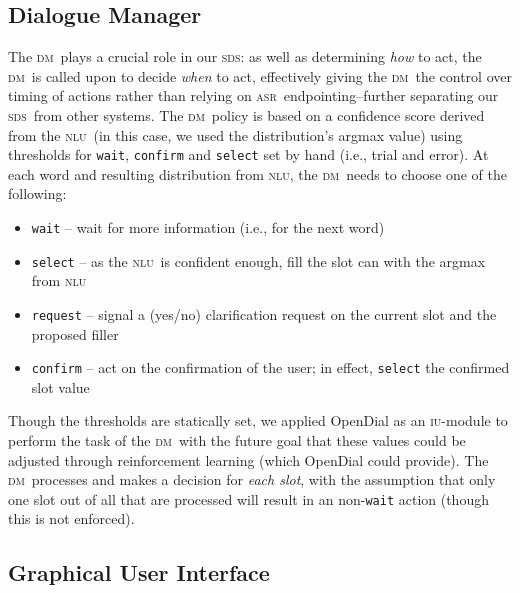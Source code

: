 \documentclass[11pt]{article}
\newcommand{\sds}[0]{\textsc{sds}}
\newcommand{\nlu}[0]{\textsc{nlu}}
\newcommand{\asr}[0]{\textsc{asr}}
\newcommand{\dm}[0]{\textsc{dm}}
\newcommand{\iu}[0]{\textsc{iu}}
\begin{document}
\subsection{Dialogue Manager}

The \dm\ plays a crucial role in our \sds: as well as determining \emph{how} to act, the \dm\ is called upon to decide \emph{when} to act, effectively giving the \dm\ the control over timing of actions rather than relying on \asr\ endpointing--further separating our \sds\ from other systems. The \dm\ policy is based on a confidence score derived from the \nlu\ (in this case, we used the distribution's argmax value) using thresholds for \texttt{wait}, \texttt{confirm} and \texttt{select} set by hand (i.e., trial and error). At each word and resulting distribution from \nlu, the \dm\ needs to choose one of the following:

\begin{itemize}
 \item \texttt{wait} -- wait for more information (i.e., for the next word) %
 \item \texttt{select} -- as the \nlu\ is confident enough, fill the slot can with the argmax from \nlu %
 \item \texttt{request} -- signal a (yes/no) clarification request on the current slot and the proposed filler%
 \item \texttt{confirm} -- act on the confirmation of the user; in effect, \texttt{select} the confirmed slot value%
\end{itemize}

Though the thresholds are statically set, we applied OpenDial \cite{Lison2015a} as an \iu-module to perform the task of the \dm\ with the future goal that these values could be adjusted through reinforcement learning (which OpenDial could provide). The \dm\ processes and makes a decision for \emph{each slot}, with the assumption that only one slot out of all that are processed will result in an non-\texttt{wait} action (though this is not enforced). 



\subsection{Graphical User Interface}
\label{section:display}
\end{document}

